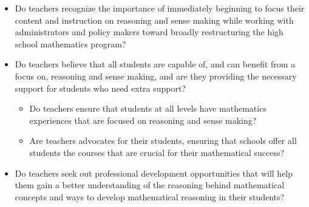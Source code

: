 {{\begin{itemize}
        \item Do teachers recognize the importance of immediately beginning to focus their content and instruction on reasoning and sense making while working with administrators and policy makers toward broadly restructuring the high school mathematics program?\vspace{\baselineskip}

        \item Do teachers believe that all students are capable of, and can benefit from a focus on, reasoning and sense making, and are they providing the necessary support for students who need extra support?
          \begin{itemize}
            \item Do teachers ensure that students at all levels have mathematics experiences that are focused on reasoning and sense making?\vspace{\baselineskip}

            \item Are teachers advocates for their students, ensuring that schools offer all students the courses that are crucial for their mathematical success?
          \end{itemize}\vspace{\baselineskip}

        \item Do teachers seek out professional development opportunities that will help them gain a better understanding of the reasoning behind mathematical concepts and ways to develop mathematical reasoning in their students?
      \end{itemize}}
  }

